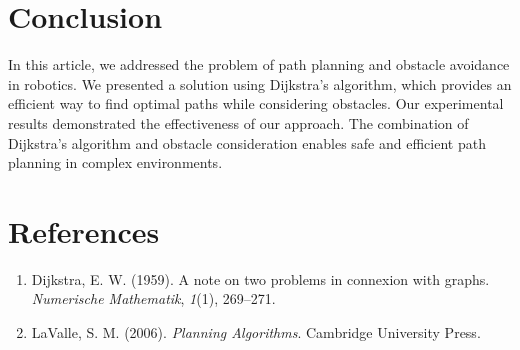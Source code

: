 \documentclass{article}
\begin{document}
\section{Conclusion}
In this article, we addressed the problem of path planning and obstacle avoidance in robotics. We presented a solution using Dijkstra's algorithm, which provides an efficient way to find optimal paths while considering obstacles. Our experimental results demonstrated the effectiveness of our approach. The combination of Dijkstra's algorithm and obstacle consideration enables safe and efficient path planning in complex environments.

\section{References}
\begin{enumerate}
  \item Dijkstra, E. W. (1959). A note on two problems in connexion with graphs. \textit{Numerische Mathematik}, \textit{1}(1), 269–271.
  \item LaValle, S. M. (2006). \textit{Planning Algorithms}. Cambridge University Press.

\end{enumerate}
\end{document}
